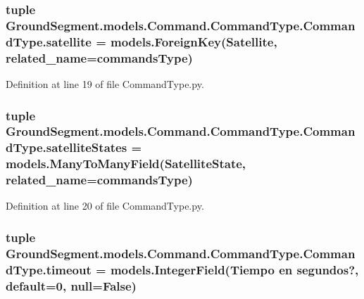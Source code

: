 \subsubsection[{satellite}]{\setlength{\rightskip}{0pt plus 5cm}tuple Ground\+Segment.\+models.\+Command.\+Command\+Type.\+Command\+Type.\+satellite = models.\+Foreign\+Key({\bf Satellite}, related\+\_\+name=\textquotesingle{}commands\+Type\textquotesingle{})\hspace{0.3cm}{\ttfamily [static]}}\label{class_ground_segment_1_1models_1_1_command_1_1_command_type_1_1_command_type_a5f1a3648f688f75d60bd249633967a1e}


Definition at line 19 of file Command\+Type.\+py.

\hypertarget{class_ground_segment_1_1models_1_1_command_1_1_command_type_1_1_command_type_a1b095c6f089002a371471c89d0123446}{}
\subsubsection[{satellite\+States}]{\setlength{\rightskip}{0pt plus 5cm}tuple Ground\+Segment.\+models.\+Command.\+Command\+Type.\+Command\+Type.\+satellite\+States = models.\+Many\+To\+Many\+Field({\bf Satellite\+State}, related\+\_\+name=\textquotesingle{}commands\+Type\textquotesingle{})\hspace{0.3cm}{\ttfamily [static]}}\label{class_ground_segment_1_1models_1_1_command_1_1_command_type_1_1_command_type_a1b095c6f089002a371471c89d0123446}


Definition at line 20 of file Command\+Type.\+py.

\hypertarget{class_ground_segment_1_1models_1_1_command_1_1_command_type_1_1_command_type_a104872b97d971cb40619e448db6f5f16}{}
\subsubsection[{timeout}]{\setlength{\rightskip}{0pt plus 5cm}tuple Ground\+Segment.\+models.\+Command.\+Command\+Type.\+Command\+Type.\+timeout = models.\+Integer\+Field(\textquotesingle{}Tiempo en segundos?\textquotesingle{}, default=0, null=False)\hspace{0.3cm}{\ttfamily [static]}}\label{class_ground_segment_1_1models_1_1_command_1_1_command_type_1_1_command_type_a104872b97d971cb40619e448db6f5f16}


